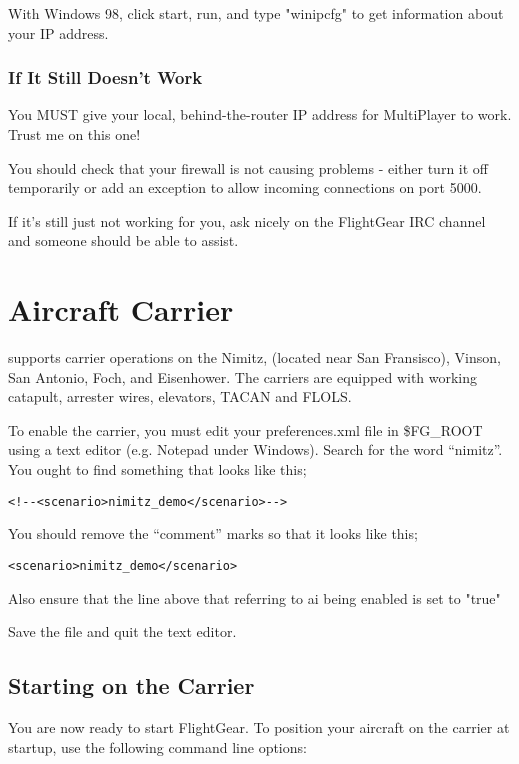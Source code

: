 With Windows 98, click start, run, and type "winipcfg" to get information about your IP address.

\subsubsection{If It Still Doesn't Work}

You MUST give your local, behind-the-router IP address for MultiPlayer to work. Trust me on this one!

You should check that your firewall is not causing problems - either turn it off temporarily or add an exception
to allow incoming connections on port 5000.

If it's still just not working for you, ask nicely on the FlightGear IRC channel and someone should be able to assist.

\section{Aircraft Carrier}\label{carrier}

\FlightGear{} supports carrier operations on the Nimitz, (located near San Fransisco), Vinson, San Antonio, Foch, and Eisenhower.
The carriers are equipped with working catapult, arrester wires, elevators, TACAN and FLOLS.

To enable the carrier, you must edit your preferences.xml file in \$FG\_ROOT using a text editor (e.g. Notepad
under Windows). Search for the word ``nimitz''. You ought to find something that looks like this;

\begin{verbatim}
<!--<scenario>nimitz_demo</scenario>-->
\end{verbatim}

You should remove the ``comment'' marks so that it looks like this;


\begin{verbatim}
<scenario>nimitz_demo</scenario>
\end{verbatim}

Also ensure that the line above that referring to ai being enabled is set to "true"

Save the file and quit the text editor.

\subsection{Starting on the Carrier}

You are now ready to start FlightGear. To position your aircraft on the carrier at startup,
use the following command line options:

